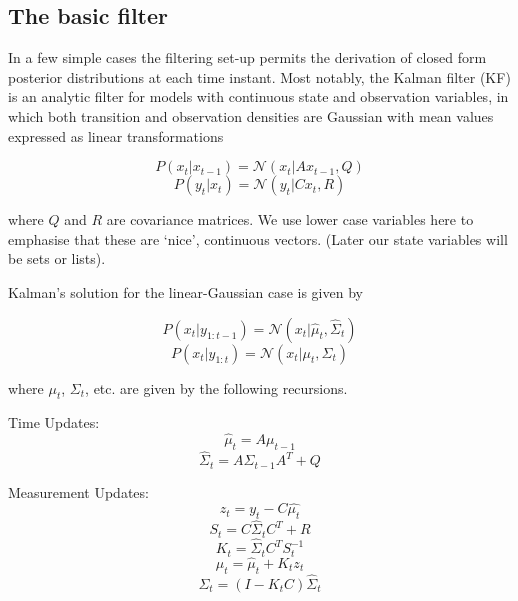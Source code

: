\subsection{The basic filter}

In a few simple cases the filtering set-up permits the derivation of closed form posterior distributions at each time instant. Most notably, the Kalman filter (KF) \cite{Kalman1960} is an analytic filter for models with continuous state and observation variables, in which both transition and observation densities are Gaussian with mean values expressed as linear transformations

\begin{equation}
P(x_t|x_{t-1}) = \mathcal{N}(x_t|Ax_{t-1}, Q)
\label{eq:LinearFilterEq1}
\end{equation}
\begin{equation}
P(y_t|x_t) = \mathcal{N}(y_t|C x_t, R)
\label{eq:LinearFilterEq2}
\end{equation}

where $Q$ and $R$ are covariance matrices. We use lower case variables here to emphasise that these are `nice', continuous vectors. (Later our state variables will be sets or lists).

Kalman's solution for the linear-Gaussian case is given by

\begin{equation}
P(x_t|y_{1:t-1}) = \mathcal{N}(x_t|\hat{\mu}_t, \hat{\Sigma}_t )
\label{eq:KFp}
\end{equation}
\begin{equation}
P(x_t|y_{1:t}) = \mathcal{N}(x_t|\mu_t, \Sigma_t )
\label{eq:KF}
\end{equation}

where $\mu_t$, $\Sigma_t$, etc. are given by the following recursions.

Time Updates:
\begin{equation}
\hat{\mu}_t = A \mu_{t-1}
\label{eq:KFTime1}
\end{equation}
\begin{equation}
\hat{\Sigma}_t = A \Sigma_{t-1} A^{T} + Q
\label{eq:KFTime2}
\end{equation}

Measurement Updates:
\begin{equation}
z_t = y_t - C \hat{\mu_t}
\label{eq:KFMeas1}
\end{equation}
\begin{equation}
S_t = C \hat{\Sigma}_t C^{T} + R
\label{eq:KFMeas2}
\end{equation}
\begin{equation}
K_t = \hat{\Sigma}_t C^{T} S_t^{-1}
\label{eq:KFMeas3}
\end{equation}
\begin{equation}
\mu_t = \hat{\mu}_t + K_t z_t
\label{eq:KFMeas4}
\end{equation}
\begin{equation}
\Sigma_t = (I - K_t C) \hat{\Sigma}_t
\label{eq:KFMeas5}
\end{equation}

